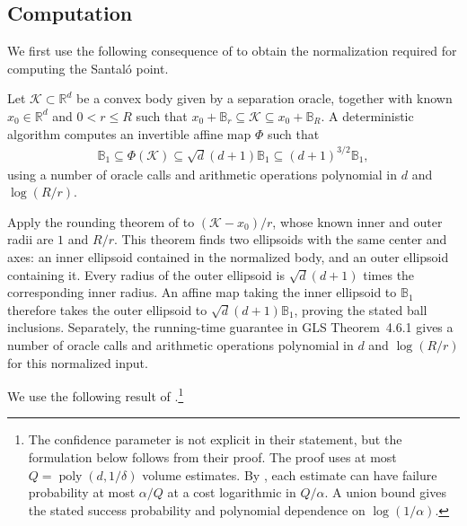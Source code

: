 \documentclass[12pt,cleveref]{jmlr}
\newcommand{\R}{\mathbb R}
\newcommand{\K}{\mathcal K}
\newcommand{\1}{\mathbf 1}
\begin{document}
\subsection{Computation}
\label{app:positioning-computation}

We first use the following consequence of
\citet[Theorem~4.6.1]{grotschel1988geometric} to obtain the normalization
required for computing the Santal\'o point.

\begin{lemma}
    \label{lem:initial-rounding}
    Let $\K\subset\R^d$ be a convex body given by a separation oracle,
    together with known $x_0\in\R^d$ and $0<r\leq R$ such that
    $x_0+\mathbb B_r\subseteq\K\subseteq x_0+\mathbb B_R$.
    A deterministic algorithm computes an invertible affine map $\Phi$
    such that
    \begin{align}
        \mathbb B_1\subseteq\Phi(\K)
        \subseteq\sqrt d(d+1)\mathbb B_1
        \subseteq(d+1)^{3/2}\mathbb B_1,
    \end{align}
    using a number of oracle calls and arithmetic operations polynomial
    in $d$ and $\log(R/r)$.
\end{lemma}

Apply the rounding theorem of
\citet*[Theorem~4.6.1]{grotschel1988geometric} to
$(\K-x_0)/r$, whose known inner and outer radii are $1$ and $R/r$.
This theorem finds two ellipsoids with the same center and axes: an inner
ellipsoid contained in the normalized body, and an outer ellipsoid
containing it. Every radius of the outer ellipsoid is $\sqrt d(d+1)$
times the corresponding inner radius. An affine map taking the inner
ellipsoid to $\mathbb B_1$ therefore takes the outer ellipsoid to
$\sqrt d(d+1)\mathbb B_1$, proving the stated ball inclusions.
Separately, the running-time guarantee in GLS Theorem~4.6.1 gives a
number of oracle calls and arithmetic operations polynomial in $d$ and
$\log(R/r)$ for this normalized input.

We use the following result of
\citet[Proposition~31]{reis2023subspace}.\footnote{The confidence parameter
    is not explicit in their statement, but the formulation below follows from
    their proof. The proof uses at most $Q=\operatorname{poly}(d,1/\delta)$
    volume estimates. By \citet[Theorem~2.1]{kannan1997random}, each estimate
    can have failure probability at most $\alpha/Q$ at a cost logarithmic in
    $Q/\alpha$. A union bound gives the stated success probability and
polynomial dependence on $\log(1/\alpha)$.}
\end{document}
